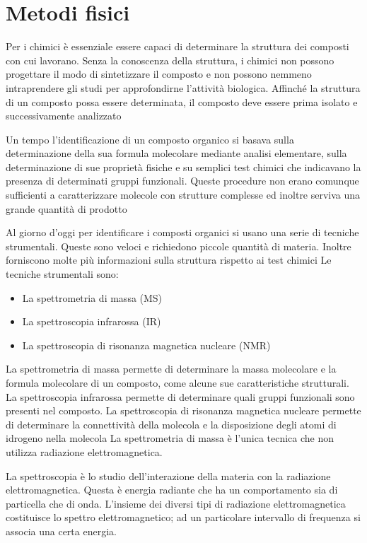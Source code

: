 \chapter*{Metodi fisici}

Per i chimici è essenziale essere capaci di determinare la struttura dei composti con cui lavorano. Senza la conoscenza della struttura, i chimici non possono progettare il modo di sintetizzare il composto e non possono nemmeno intraprendere gli studi per approfondirne l'attività biologica. Affinché la struttura di un composto possa essere determinata, il composto deve essere prima isolato e successivamente analizzato

Un tempo l'identificazione di un composto organico si basava sulla determinazione della sua formula molecolare mediante analisi elementare, sulla determinazione di sue proprietà fisiche e su semplici test chimici che indicavano la presenza di determinati gruppi funzionali.
Queste procedure non erano comunque sufficienti a caratterizzare molecole con strutture complesse ed inoltre serviva una grande quantità di prodotto

Al giorno d'oggi per identificare i composti organici si usano una serie di tecniche strumentali. Queste sono veloci e richiedono piccole quantità di materia. Inoltre forniscono molte più informazioni sulla struttura rispetto ai test chimici
Le tecniche strumentali sono:
\begin{itemize}
\item La spettrometria di massa (MS)
\item La spettroscopia infrarossa (IR)
\item La spettroscopia di risonanza magnetica nucleare (NMR)
\end{itemize}

La spettrometria di massa permette di determinare la massa molecolare e la formula molecolare di un composto, come alcune sue caratteristiche strutturali. La spettroscopia infrarossa permette di determinare quali gruppi funzionali sono presenti nel composto. La spettroscopia di risonanza magnetica nucleare permette di determinare la connettività della molecola e la disposizione degli atomi di idrogeno nella molecola
La spettrometria di massa è l'unica tecnica che non utilizza radiazione elettromagnetica.

La spettroscopia è lo studio dell'interazione della materia con la radiazione elettromagnetica. Questa è energia radiante che ha un comportamento sia di particella che di onda. L'insieme dei diversi tipi di radiazione elettromagnetica costituisce lo spettro elettromagnetico; ad un particolare intervallo di frequenza si associa una certa energia.

